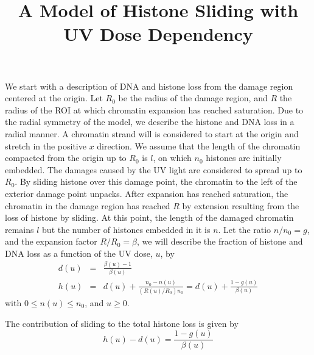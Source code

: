 \documentclass[12pt]{report}
\begin{document}
	\title{A Model of Histone Sliding with UV Dose Dependency}
	\maketitle
	We start with a description of DNA and histone loss from the damage region centered at the origin. Let $R_0$ be the radius of the damage region, and $R$ the radius of the ROI at which chromatin expansion has reached saturation. Due to the radial symmetry of the model, we describe the histone and DNA loss in a radial manner. A chromatin strand will is considered to start at the origin and stretch in the positive $x$ direction. 
	We assume that the length of the chromatin compacted from the origin up to $R_0$ is $l$, on which $n_0$ histones are initially embedded. The damages caused by the UV light are considered to spread up to $R_0$. By sliding histone over this damage point, the chromatin to the left of the exterior damage point unpacks. After expansion has reached saturation, the chromatin in the damage region has reached $R$ by extension resulting from the loss of histone by sliding. At this point, the length of the damaged chromatin remains $l$ but the number of histones embedded in it is $n$. Let the ratio $n/n_0 =g$, and the expansion factor $R/R_0=\beta$, we will describe the fraction of histone and DNA loss as a function of the UV dose, $u$, by
	\begin{eqnarray}
	d(u) &=& \frac{\beta(u)-1}{\beta(u)}\\
	h(u) &=& d(u) +\frac{n_0-n(u)}{(R(u)/R_0) n_0}=d(u)+\frac{1-g(u)}{\beta(u)}
	\end{eqnarray}
 with $0\leq n(u)\leq n_0$, and $u\geq0$. 
 
The contribution of sliding to the total histone loss is given by
\begin{equation}
h(u)-d(u)=\frac{1-g(u)}{\beta(u)}
\end{equation}
\end{document}
